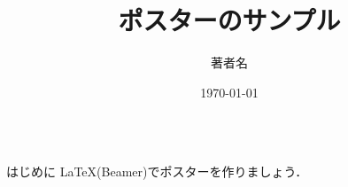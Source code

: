 \documentclass[unicode]{beamer}
\title{ポスターのサンプル}
\author{著者名}
\institute{所属機関名}
\date{\today}
\begin{document}
\begin{frame}
\begin{columns}[t]
    \begin{column}{.32\linewidth}
        \begin{block}{はじめに}
            \LaTeX{}(Beamer)でポスターを作りましょう．
        \end{block}
    \end{column}
\end{columns}
\end{frame}
\end{document}
